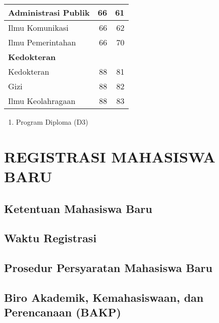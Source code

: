 \documentclass[
]{book}
\providecommand{\tightlist}{%
  \setlength{\itemsep}{0pt}\setlength{\parskip}{0pt}}
\begin{document}
\begin{longtable}{l|r|r}
\hline
\hspace{1em}Administrasi Publik & 66 & 61\\
\hline
\hspace{1em}Ilmu Komunikasi & 66 & 62\\
\hline
\hspace{1em}Ilmu Pemerintahan & 66 & 70\\
\hline
\multicolumn{3}{l}{\textbf{Kedokteran}}\\
\hline
\hspace{1em}Kedokteran & 88 & 81\\
\hline
\hspace{1em}Gizi & 88 & 82\\
\hline
\hspace{1em}Ilmu Keolahragaan & 88 & 83\\
\hline
\end{longtable}

\begin{enumerate}
\def\labelenumi{\arabic{enumi}.}
\setcounter{enumi}{2}
\tightlist
\item
  Program Diploma (D3)
\end{enumerate}

\hypertarget{registrasi-mahasiswa-baru}{%
\chapter{REGISTRASI MAHASISWA BARU}\label{registrasi-mahasiswa-baru}}

\hypertarget{ketentuan-mahasiswa-baru}{%
\section{Ketentuan Mahasiswa Baru}\label{ketentuan-mahasiswa-baru}}

\hypertarget{waktu-registrasi}{%
\section{Waktu Registrasi}\label{waktu-registrasi}}

\hypertarget{prosedur-persyaratan-mahasiswa-baru}{%
\section{Prosedur Persyaratan Mahasiswa Baru}\label{prosedur-persyaratan-mahasiswa-baru}}

\hypertarget{biro-akademik-kemahasiswaan-dan-perencanaan-bakp}{%
\section{Biro Akademik, Kemahasiswaan, dan Perencanaan (BAKP)}\label{biro-akademik-kemahasiswaan-dan-perencanaan-bakp}}
\end{document}
